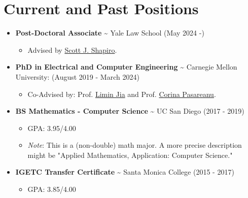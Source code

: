 \documentclass[11pt]{article}
\begin{document}
\section*{Current and Past Positions}
\label{sec:org395eab4}
\begin{itemize}
\item \textbf{Post-Doctoral Associate} \textasciitilde{} Yale Law School (May 2024 -)
\begin{itemize}
\item Advised by \href{https://law.yale.edu/scott-j-shapiro}{Scott J. Shapiro}.
\end{itemize}

\item \textbf{PhD in Electrical and Computer Engineering} \textasciitilde{} Carnegie
Mellon University: (August 2019 - March 2024)
\begin{itemize}
\item Co-Advised by: Prof. \href{http://www.andrew.cmu.edu/user/liminjia/}{Limin Jia} and Prof. \href{https://www.andrew.cmu.edu/user/pcorina/}{Corina Pasareanu}.
\end{itemize}

\item \textbf{BS Mathematics - Computer Science} \textasciitilde{} UC San Diego (2017 - 2019)
\begin{itemize}
\item GPA: 3.95/4.00
\item \emph{Note}: This is a (non-double) math major. A more precise description
might be "Applied Mathematics, Application: Computer Science."
\end{itemize}

\item \textbf{IGETC Transfer Certificate} \textasciitilde{} Santa Monica College (2015 - 2017)
\begin{itemize}
\item GPA: 3.85/4.00
\end{itemize}
\end{itemize}
\end{document}
